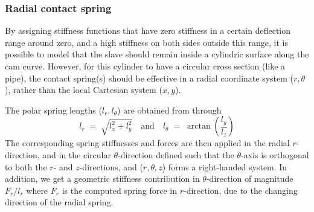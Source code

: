 \subsubsection{Radial contact spring}

By assigning stiffness functions that have zero stiffness in a certain
deflection range around zero, and a high stiffness on both sides outside
this range, it is possible to model that the slave should remain inside
a cylindric surface along the cam curve.
However, for this cylinder to have a circular cross section (like a pipe),
the contact spring(s) should be effective in a radial coordinate system
($r,\theta$), rather than the local Cartesian system ($x,y$).

The polar spring lengths ($l_r,l_\theta$) are obtained from
 through
%
\begin{equation}
l_r \;=\; \sqrt{l_x^2+l_y^2} \quad\text{and}\quad
l_\theta \;=\; \arctan\left(\frac{l_y}{l_z}\right)
\end{equation}
%
The corresponding spring stiffnesses and forces are then applied in the radial
$r$-direction, and in the circular $\theta$-direction defined such that the
$\theta$-axis is orthogonal to both the $r$- and $z$-directions,
and ($r,\theta,z$) forms a right-handed system.
In addition, we get a geometric stiffness contribution in $\theta$-direction
of magnitude $F_r/l_r$ where $F_r$ is the computed spring force in
$r$-direction, due to the changing direction of the radial spring.

